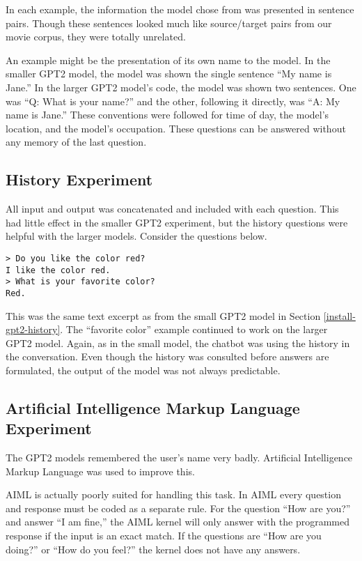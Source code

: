 In each example, the information the model chose from was presented in sentence pairs. Though these sentences looked much like source/target pairs from our movie corpus, they were totally unrelated.

An example might be the presentation of its own name to the model. In the smaller GPT2 model, the model was shown the single sentence ``My name is Jane.'' In the larger GPT2 model's code, the model was shown two sentences. One was ``Q: What is your name?'' and the other, following it directly, was ``A: My name is Jane.'' These conventions were followed for time of day, the model's location, and the model's occupation. These questions can be answered without any memory of the last question.

\subsection{History Experiment}

All input and output was concatenated and included with each question. This had little effect in the smaller GPT2 experiment, but the history questions were helpful with the larger models. Consider the questions below.
\begin{verbatim}
> Do you like the color red?
I like the color red.
> What is your favorite color?
Red.
\end{verbatim}
This was the same text excerpt as from the small GPT2 model in Section \ref{install-gpt2-history}. The ``favorite color'' example continued to work on the larger GPT2 model. Again, as in the small model, the chatbot was using the history in the conversation. Even though the history was consulted before answers are formulated, the output of the model was not always predictable. %


\subsection{Artificial Intelligence Markup Language Experiment}


The GPT2 models remembered the user's name very badly. %
Artificial Intelligence Markup Language was used to improve this. 

AIML is actually poorly suited for handling this task. In AIML every question and response must be coded as a separate rule. For the question ``How are you?'' and answer ``I am fine,'' the AIML kernel will only answer with the programmed response if the input is an exact match. If the questions are ``How are you doing?'' or ``How do you feel?'' the kernel does not have any answers. %


